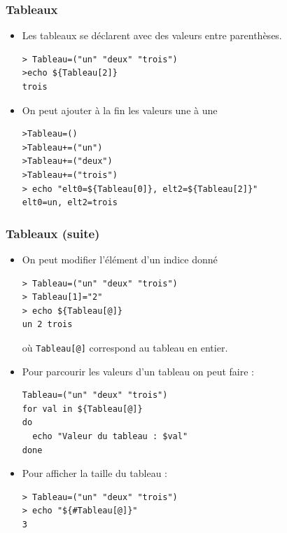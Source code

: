 \documentclass{beamer}
\newenvironment{terminal}{\color{white}\begin{snugshade*}}
{\end{snugshade*}\color{black}}
\begin{document}
\begin{frame}[fragile]
  \frametitle{Tableaux}
  \begin{itemize}
  \item  Les tableaux se déclarent avec des valeurs entre parenthèses.
  \begin{terminal}
\begin{verbatim}
> Tableau=("un" "deux" "trois")
>echo ${Tableau[2]}
trois
\end{verbatim}
\end{terminal}
\item On peut ajouter à la fin les valeurs une à une
  \begin{terminal}
\begin{verbatim}
>Tableau=()
>Tableau+=("un")
>Tableau+=("deux")
>Tableau+=("trois")
> echo "elt0=${Tableau[0]}, elt2=${Tableau[2]}"
elt0=un, elt2=trois
\end{verbatim}
\end{terminal}
\end{itemize}
\end{frame}



\begin{frame}[fragile]
  \frametitle{Tableaux (suite)}
  \begin{itemize}
  \item  On peut modifier l'élément d'un indice donné
      \begin{scriptsize}
  \begin{terminal}
\begin{verbatim}
> Tableau=("un" "deux" "trois")
> Tableau[1]="2"
> echo ${Tableau[@]}
un 2 trois
\end{verbatim}
  \end{terminal}
    \end{scriptsize}
  où \texttt{Tableau[@]} correspond au tableau en entier.
\item Pour parcourir les valeurs d'un tableau on peut faire :
  \begin{scriptsize}
  \begin{terminal}
\begin{verbatim}
Tableau=("un" "deux" "trois")
for val in ${Tableau[@]}
do
  echo "Valeur du tableau : $val"
done
\end{verbatim}
  \end{terminal}
  \end{scriptsize}
\item Pour afficher la taille du tableau :
      \begin{scriptsize}
  \begin{terminal}
\begin{verbatim}
> Tableau=("un" "deux" "trois")
> echo "${#Tableau[@]}"
3
\end{verbatim}
      \end{terminal}
        \end{scriptsize}
  \end{itemize}
\end{frame}
\end{document}
